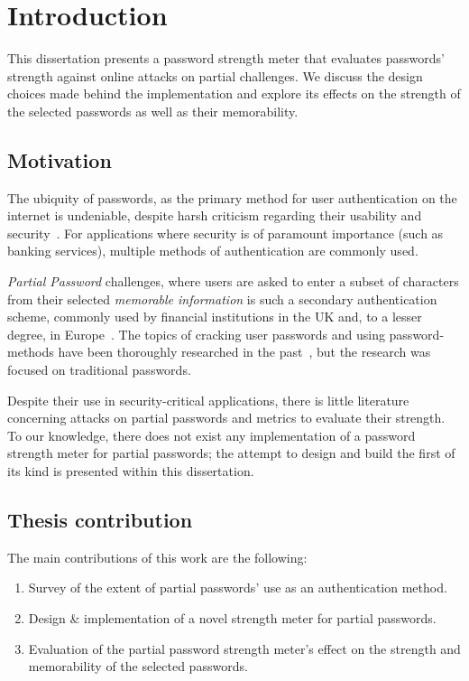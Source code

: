 
\chapter{Introduction}
  \label{cha:intro}
  This dissertation presents a password strength meter that evaluates passwords' strength against online attacks on partial challenges. We discuss the design choices made behind the implementation and explore its effects on the strength of the selected passwords as well as their memorability.

  \section{Motivation}
    \label{sec:motivation}
    The ubiquity of passwords, as the primary method for user authentication on the internet is undeniable, despite harsh criticism regarding their usability and security~\cite{replace_pass}. For applications where security is of paramount importance (such as banking services), multiple methods of authentication are commonly used.

    \emph{Partial Password} challenges, where users are asked to enter a subset of characters from their selected \emph{memorable information} is such a secondary authentication scheme, commonly used by financial institutions in the UK and, to a lesser degree, in Europe~\cite{2fa_uk}. The topics of cracking user passwords and using password-methods have been thoroughly researched in the past~\cite{pass_strength_empirical,pass_strength}, but the research was focused on traditional passwords.

    Despite their use in security-critical applications, there is little literature concerning attacks on partial passwords and metrics to evaluate their strength. To our knowledge, there does not exist any implementation of a password strength meter for partial passwords; the attempt to design and build the first of its kind is presented within this dissertation.

  \section{Thesis contribution}
    \label{sec:contribution}
    The main contributions of this work are the following:
    \begin{enumerate}
      \setlength{\itemsep}{2pt}
      \setlength{\parskip}{0pt}
      \setlength{\parsep}{0pt}
      \item Survey of the extent of partial passwords' use as an authentication method.
      \item Design \& implementation of a novel strength meter for partial passwords.
      \item Evaluation of the partial password strength meter's effect on the strength and memorability of the selected passwords.
    \end{enumerate}

